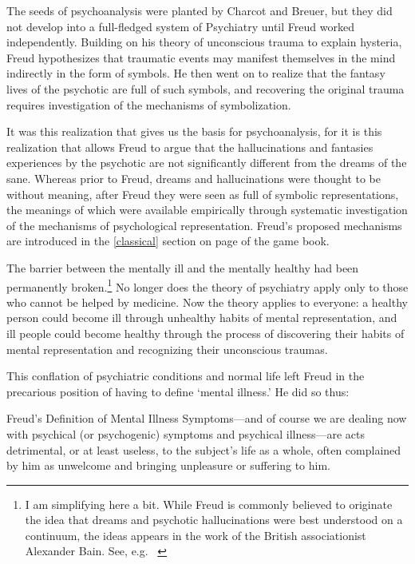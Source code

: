 \begin{refsection}
The seeds of psychoanalysis were planted by Charcot and Breuer, but they did not develop into a full-fledged system of Psychiatry until Freud worked independently. Building on his theory of unconscious trauma to explain hysteria, Freud hypothesizes that traumatic events may manifest themselves in the mind indirectly in the form of symbols. He then went on to realize that the fantasy lives of the psychotic are full of such symbols, and recovering the original trauma requires investigation of the mechanisms of symbolization.

It was this realization that gives us the basis for psychoanalysis, for it is this realization that allows Freud to argue that the hallucinations and fantasies experiences by the psychotic are not significantly different from the dreams of the sane. Whereas prior to Freud, dreams and hallucinations were thought to be without meaning, after Freud they were seen as full of symbolic representations, the meanings of which were available empirically through systematic investigation of the mechanisms of psychological representation. Freud's proposed mechanisms are introduced in the \ref{classical} section on page \pageref{classical} of the game book.

The barrier between the mentally ill and the mentally healthy had been permanently broken.\footnote{I am simplifying here a bit. While Freud is commonly believed to originate the idea that dreams and psychotic hallucinations were best understood on a continuum, the ideas appears in the work of the British associationist Alexander Bain. See, e.g. ~\citep[p. 45]{Bain:1903tf}} No longer does the theory of psychiatry apply only to those who cannot be helped by medicine. Now the theory applies to everyone: a healthy person could become ill through unhealthy habits of mental representation, and ill people could become healthy through the process of discovering their habits of mental representation and recognizing their unconscious traumas. 

This conflation of psychiatric conditions and normal life left Freud in the precarious position of having to define `mental illness.' He did so thus:
\begin{apatextbox}{Freud's Definition of Mental Illness} Symptoms---and of course we are dealing now with psychical (or psychogenic) symptoms and psychical illness---are acts detrimental, or at least useless, to the subject's life as a whole, often complained by him as unwelcome and bringing unpleasure or suffering to him. ~\citep[p. 445]{Freud:QdOvAgyZ}


\end{apatextbox}
\end{refsection}
